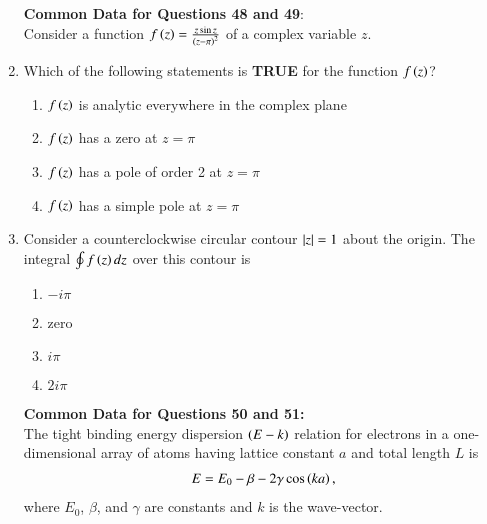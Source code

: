\documentclass[journal]{IEEEtran}
\begin{document}
\begin{enumerate}
\begin{multicols}{2}
\begin{enumerate}
        \end{enumerate}
    \end{multicols}

    \textbf{Common Data for Questions 48 and 49}: \\
    Consider a function $f\left(z\right) = \frac{z \sin z}{\left(z - \pi\right)^2}$ of a complex variable $z$.
    
    \item Which of the following statements is \textbf{TRUE} for the function $f\left(z\right)$?
    \begin{enumerate}
        \item $f\left(z\right)$ is analytic everywhere in the complex plane
        \item $f\left(z\right)$ has a zero at $z = \pi$
        \item $f\left(z\right)$ has a pole of order 2 at $z = \pi$
        \item $f\left(z\right)$ has a simple pole at $z = \pi$
    \end{enumerate}
    
    \item Consider a counterclockwise circular contour $\left\vert z\right\vert = 1$ about the origin. The integral
    $\oint f\left(z\right) dz$ over this contour is
    \begin{multicols}{4}
        \begin{enumerate}
            \item $-i\pi$
            \item zero
            \item $i\pi$
            \item $2i\pi$
        \end{enumerate}
    \end{multicols}

    \textbf{Common Data for Questions 50 and 51:} \\
    The tight binding energy dispersion $\left(E-k\right)$ relation for electrons in a one-dimensional
    array of atoms having lattice constant $a$ and total length $L$ is 
    \begin{align*}    
    E = E_0 - \beta - 2\gamma \cos\left(ka\right),
    \end{align*}
    where $E_0$, $\beta$, and $\gamma$ are constants and $k$ is the wave-vector.


\end{enumerate}
\end{document}

